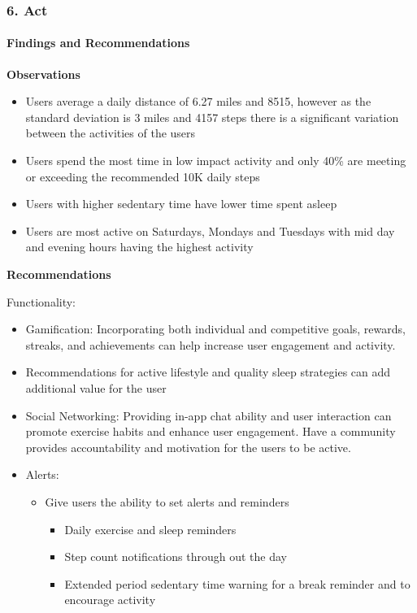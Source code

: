 \documentclass[
]{article}
\providecommand{\tightlist}{%
  \setlength{\itemsep}{0pt}\setlength{\parskip}{0pt}}
\begin{document}
\subsubsection{\texorpdfstring{\textbf{6. Act}}{6. Act}}\label{act}

\paragraph{\texorpdfstring{\textbf{Findings and
Recommendations}}{Findings and Recommendations}}\label{findings-and-recommendations}

\textbf{Observations}

\begin{itemize}
\tightlist
\item
  Users average a daily distance of 6.27 miles and 8515, however as the
  standard deviation is 3 miles and 4157 steps there is a significant
  variation between the activities of the users
\item
  Users spend the most time in low impact activity and only 40\% are
  meeting or exceeding the recommended 10K daily steps
\item
  Users with higher sedentary time have lower time spent asleep
\item
  Users are most active on Saturdays, Mondays and Tuesdays with mid day
  and evening hours having the highest activity
\end{itemize}

\textbf{Recommendations}

Functionality:

\begin{itemize}
\item
  Gamification: Incorporating both individual and competitive goals,
  rewards, streaks, and achievements can help increase user engagement
  and activity.
\item
  Recommendations for active lifestyle and quality sleep strategies can
  add additional value for the user
\item
  Social Networking: Providing in-app chat ability and user interaction
  can promote exercise habits and enhance user engagement. Have a
  community provides accountability and motivation for the users to be
  active.
\item
  Alerts:

  \begin{itemize}
  \tightlist
  \item
    Give users the ability to set alerts and reminders

    \begin{itemize}
    \tightlist
    \item
      Daily exercise and sleep reminders
    \item
      Step count notifications through out the day
    \item
      Extended period sedentary time warning for a break reminder and to
      encourage activity
    \end{itemize}
  \end{itemize}
\end{itemize}
\end{document}
